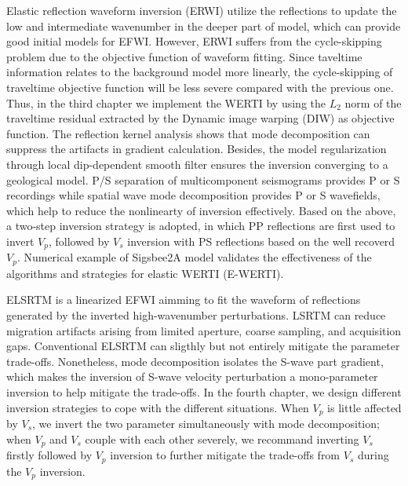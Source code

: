 \begin{eabstract}
Elastic reflection waveform inversion (ERWI) utilize the reflections to update the low and
intermediate wavenumber in the
deeper part of model, which can provide good initial models for EFWI. However, ERWI suffers from
the cycle-skipping problem due to the objective function of waveform fitting. Since taveltime
information relates to the background model more linearly, the cycle-skipping of traveltime
objective function will be less severe
compared with the previous one. Thus, in the third chapter we implement the WERTI by using the $L_2$ norm of the traveltime
residual extracted by the Dynamic image warping (DIW) as objective function.
The reflection kernel analysis shows that mode decomposition can suppress the artifacts in
gradient calculation. 
Besides, the model regularization through local dip-dependent smooth filter ensures the inversion converging to a
geological model. 
P/S
separation of multicomponent seismograms provides P or S recordings while spatial wave mode
decomposition provides P or S wavefields, which help
to  reduce the nonlinearty of inversion effectively.
Based on the above, a two-step inversion strategy is adopted, in which PP reflections are first used to invert $V_p$,
followed by $V_s$ inversion with PS reflections based on the well recoverd $V_p$. 
Numerical example of Sigsbee2A model validates the effectiveness of the
algorithms and strategies for elastic WERTI (E-WERTI).

ELSRTM is a linearized EFWI aimming to fit the waveform of reflections generated by the inverted
high-wavenumber perturbations. 
LSRTM can reduce migration artifacts arising
from limited aperture, coarse sampling, and acquisition gaps. Conventional ELSRTM can sligthly but
not entirely mitigate the parameter trade-offs. 
Nonetheless, mode decomposition
isolates the S-wave part gradient, which makes the inversion of S-wave velocity
perturbation a mono-parameter inversion to help mitigate the trade-offs. In the fourth chapter, we
design different inversion strategies to cope with the different situations. When $V_p$ is little
affected by $V_s$, we invert the two parameter simultaneously with mode decomposition; when $V_p$
and $V_s$ couple with each
other severely, we recommand inverting $V_s$ firstly followed by $V_p$ inversion to further mitigate
the trade-offs from $V_s$ during the $V_p$ inversion.


\end{eabstract}
